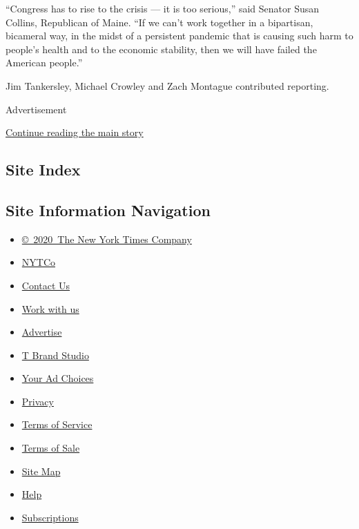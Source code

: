 ``Congress has to rise to the crisis --- it is too serious,'' said
Senator Susan Collins, Republican of Maine. ``If we can't work together
in a bipartisan, bicameral way, in the midst of a persistent pandemic
that is causing such harm to people's health and to the economic
stability, then we will have failed the American people.''

Jim Tankersley, Michael Crowley and Zach Montague contributed reporting.

Advertisement

\protect\hyperlink{after-bottom}{Continue reading the main story}

\hypertarget{site-index}{%
\subsection{Site Index}\label{site-index}}

\hypertarget{site-information-navigation}{%
\subsection{Site Information
Navigation}\label{site-information-navigation}}

\begin{itemize}
\tightlist
\item
  \href{https://help.nytimes.com/hc/en-us/articles/115014792127-Copyright-notice}{©~2020~The
  New York Times Company}
\end{itemize}

\begin{itemize}
\tightlist
\item
  \href{https://www.nytco.com/}{NYTCo}
\item
  \href{https://help.nytimes.com/hc/en-us/articles/115015385887-Contact-Us}{Contact
  Us}
\item
  \href{https://www.nytco.com/careers/}{Work with us}
\item
  \href{https://nytmediakit.com/}{Advertise}
\item
  \href{http://www.tbrandstudio.com/}{T Brand Studio}
\item
  \href{https://www.nytimes.com/privacy/cookie-policy\#how-do-i-manage-trackers}{Your
  Ad Choices}
\item
  \href{https://www.nytimes.com/privacy}{Privacy}
\item
  \href{https://help.nytimes.com/hc/en-us/articles/115014893428-Terms-of-service}{Terms
  of Service}
\item
  \href{https://help.nytimes.com/hc/en-us/articles/115014893968-Terms-of-sale}{Terms
  of Sale}
\item
  \href{https://spiderbites.nytimes.com}{Site Map}
\item
  \href{https://help.nytimes.com/hc/en-us}{Help}
\item
  \href{https://www.nytimes.com/subscription?campaignId=37WXW}{Subscriptions}
\end{itemize}
